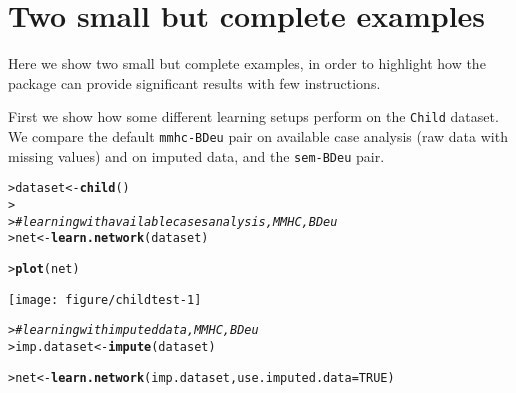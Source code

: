\documentclass{article}\usepackage[]{graphicx}\usepackage[]{color}
\makeatletter
\def\maxwidth{ %
  \ifdim\Gin@nat@width>\linewidth
    \linewidth
  \else
    \Gin@nat@width
  \fi
}
\newcommand{\hlnum}[1]{\textcolor[rgb]{0.686,0.059,0.569}{#1}}%
\newcommand{\hlcom}[1]{\textcolor[rgb]{0.678,0.584,0.686}{\textit{#1}}}%
\newcommand{\hlstd}[1]{\textcolor[rgb]{0.345,0.345,0.345}{#1}}%
\newcommand{\hlkwb}[1]{\textcolor[rgb]{0.69,0.353,0.396}{#1}}%
\newcommand{\hlkwc}[1]{\textcolor[rgb]{0.333,0.667,0.333}{#1}}%
\newcommand{\hlkwd}[1]{\textcolor[rgb]{0.737,0.353,0.396}{\textbf{#1}}}%
\newenvironment{kframe}{%
 \def\at@end@of@kframe{}%
 \ifinner\ifhmode%
  \def\at@end@of@kframe{\end{minipage}}%
  \begin{minipage}{\columnwidth}%
 \fi\fi%
 \def\FrameCommand##1{\hskip\@totalleftmargin \hskip-\fboxsep
 \colorbox{shadecolor}{##1}\hskip-\fboxsep
     \hskip-\linewidth \hskip-\@totalleftmargin \hskip\columnwidth}%
 \MakeFramed {\advance\hsize-\width
   \@totalleftmargin\z@ \linewidth\hsize
   \@setminipage}}%
 {\par\unskip\endMakeFramed%
 \at@end@of@kframe}
\newenvironment{knitrout}{}{} %
\makeatother
\begin{document}
\section{Two small but complete examples}
Here we show two small but complete examples, in order to highlight how the package can provide significant results
with few instructions.

First we show how some different learning setups perform on the \texttt{Child} dataset. We compare the default
\texttt{mmhc-BDeu} pair on available case analysis (raw data with missing values) and on imputed data, and
the \texttt{sem-BDeu} pair.

\begin{knitrout}
\color{fgcolor}\begin{kframe}
\begin{alltt}
\hlstd{> }\hlstd{dataset} \hlkwb{<-} \hlkwd{child}\hlstd{()}
\hlstd{> }
\hlstd{> }\hlcom{# learning with available cases analysis, MMHC, BDeu}
\hlstd{> }\hlstd{net} \hlkwb{<-} \hlkwd{learn.network}\hlstd{(dataset)}
\end{alltt}


{\ttfamily\noindent\itshape\color{messagecolor}{bnstruct :: learning the structure using MMHC ...\\bnstruct :: learning using MMHC completed.\\bnstruct :: learning network parameters ... \\bnstruct :: parameter learning done.}}\begin{alltt}
\hlstd{> }\hlkwd{plot}\hlstd{(net)}
\end{alltt}
\end{kframe}
\texttt{[image: figure/childtest-1]} 
\begin{kframe}\begin{alltt}
\hlstd{> }\hlcom{# learning with imputed data, MMHC, BDeu}
\hlstd{> }\hlstd{imp.dataset} \hlkwb{<-} \hlkwd{impute}\hlstd{(dataset)}
\end{alltt}


{\ttfamily\noindent\itshape\color{messagecolor}{bnstruct :: performing imputation ...\\bnstruct :: imputation finished.}}\begin{alltt}
\hlstd{> }\hlstd{net} \hlkwb{<-} \hlkwd{learn.network}\hlstd{(imp.dataset,} \hlkwc{use.imputed.data} \hlstd{=} \hlnum{TRUE}\hlstd{)}
\end{alltt}



\end{kframe}
\end{knitrout}
\end{document}
